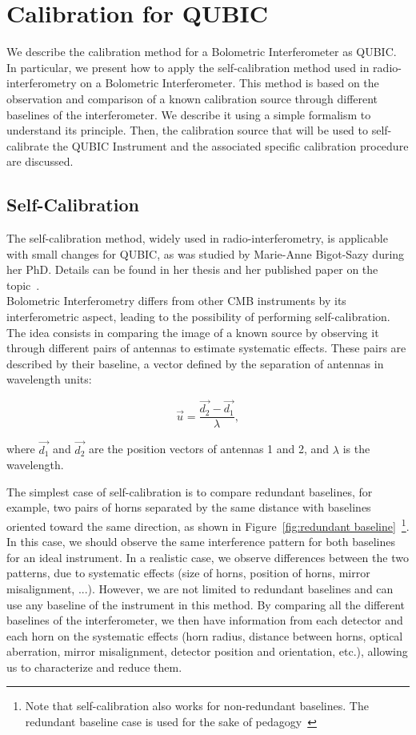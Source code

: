 \documentclass[../../thesis.tex]{subfiles}
\begin{document}
\section{Calibration for QUBIC}
We describe the calibration method for a Bolometric Interferometer as QUBIC. In particular, we present how to apply the self-calibration method used in radio-interferometry on a Bolometric Interferometer. This method is based on the observation and comparison of a known calibration source through different baselines of the interferometer. We describe it using a simple formalism to understand its principle. Then, the calibration source that will be used to self-calibrate the QUBIC Instrument and the associated specific calibration procedure are discussed.

\subsection{Self-Calibration} \label{sub:selfcal}
The self-calibration method, widely used in radio-interferometry, is applicable with small changes for QUBIC, as was studied by Marie-Anne Bigot-Sazy during her PhD. Details can be found in her thesis\cite{thesismarie} and her published paper on the topic~\cite{paper_marie_selfcal}. \\
Bolometric Interferometry differs from other CMB instruments by its interferometric aspect, leading to the possibility of performing self-calibration. The idea consists in comparing the image of a known source by observing it through different pairs of antennas to estimate systematic effects. These pairs are described by their baseline, a vector defined by the separation of antennas in wavelength units:

\begin{equation}
    \vec{u} = \frac{\vec{d_2} - \vec{d_1}}{\lambda},
\end{equation}

where $\vec{d_1}$ and $\vec{d_2}$ are the position vectors of antennas 1 and 2, and $\lambda$ is the wavelength.

The simplest case of self-calibration is to compare redundant baselines, for example, two pairs of horns separated by the same distance with baselines oriented toward the same direction, as shown in Figure~\ref{fig:redundant baseline}~\footnote{Note that self-calibration also works for non-redundant baselines. The redundant baseline case is used for the sake of pedagogy~\cite{paper_marie_selfcal}}. In this case, we should observe the same interference pattern for both baselines for an ideal instrument. In a realistic case, we observe differences between the two patterns, due to systematic effects (size of horns, position of horns, mirror misalignment, ...). However, we are not limited to redundant baselines and can use any baseline of the instrument in this method\cite{paper_marie_selfcal}. By comparing all the different baselines of the interferometer, we then have information from each detector and each horn on the systematic effects (horn radius, distance between horns, optical aberration, mirror misalignment, detector position and orientation, etc.), allowing us to characterize and reduce them.
\end{document}
